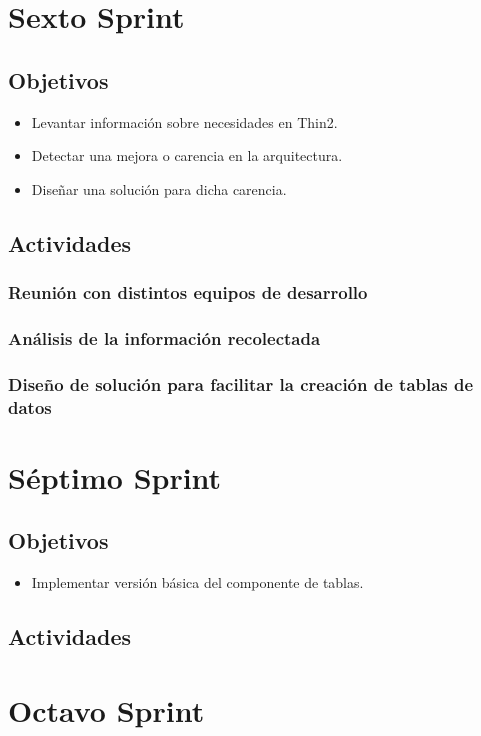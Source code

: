 \section{Sexto Sprint}

\subsection{Objetivos}
\begin{itemize}
  \item Levantar información sobre necesidades en Thin2.
  \item Detectar una mejora o carencia en la arquitectura.
  \item Diseñar una solución para dicha carencia.
\end{itemize}
\subsection{Actividades}
\subsubsection{Reunión con distintos equipos de desarrollo}
\subsubsection{Análisis de la información recolectada}
\subsubsection{Diseño de solución para facilitar la creación de tablas de datos}


\section{Séptimo Sprint}

\subsection{Objetivos}
\begin{itemize}
  \item Implementar versión básica del componente de tablas.
\end{itemize}
\subsection{Actividades}



\section{Octavo Sprint}

